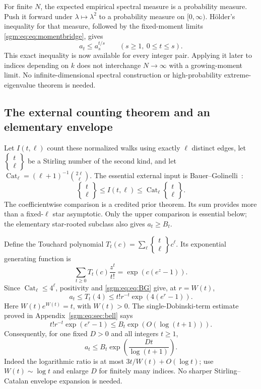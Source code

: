 \documentclass[11pt,letterpaper]{article}
\theoremstyle{remark}\newtheorem{remark}[theorem]{Remark}
\newcommand{\Cat}{\operatorname{Cat}}\newcommand{\E}{\mathbb E}\newcommand{\Prob}{\mathbb P}\newcommand{\ind}{\mathbf 1}
\newcommand{\Stir}[2]{\left\{\begin{matrix}#1\\#2\end{matrix}\right\}}
\theoremstyle{definition}\newtheorem{definition}[theorem]{Definition}
\begin{document}
For finite $N$, the expected empirical spectral measure is a probability measure. Push it forward under $\lambda\mapsto\lambda^2$ to a probability measure on $[0,\infty)$. H\"older's inequality for that measure, followed by the fixed-moment limits \eqref{sgm:eq:eq:momentbridge}, gives
\begin{equation}\label{sgm:eq:eq:holder}
 a_t\le a_s^{t/s}\qquad(s\ge1,\ 0\le t\le s).
\end{equation}
This exact inequality is now available for every integer pair. Applying it later to indices depending on $k$ does not interchange $N\to\infty$ with a growing-moment limit. No infinite-dimensional spectral construction or high-probability extreme-eigenvalue theorem is needed.

\subsection{The external counting theorem and an elementary envelope}
Let $I(t,\ell)$ count these normalized walks using exactly $\ell$ distinct edges, let $\Stir t\ell$ be a Stirling number of the second kind, and let $\Cat_\ell=(\ell+1)^{-1}\binom{2\ell}{\ell}$. The essential external input is Bauer--Golinelli~\cite[Section 5.5, equation (9)]{bg}:
\begin{equation}\label{sgm:eq:eq:BG}
 \Stir t\ell\le I(t,\ell)\le\Cat_\ell\Stir t\ell.
\end{equation}
The coefficientwise comparison is a credited prior theorem. Its sum provides more than a fixed-$\ell$ star asymptotic. Only the upper comparison is essential below; the elementary star-rooted subclass also gives $a_t\ge B_t$.

Define the Touchard polynomial $T_t(c)=\sum_\ell\Stir t\ell c^\ell$. Its exponential generating function is
\[
 \sum_{t\ge0}T_t(c)\frac{z^t}{t!}=\exp(c(e^z-1)).
\]
Since $\Cat_\ell\le4^\ell$, positivity and \eqref{sgm:eq:eq:BG} give, at $r=W(t)$,
\[
 a_t\le T_t(4)\le t!r^{-t}\exp(4(e^r-1)).
\]
Here $W(t)e^{W(t)}=t$, with $W(t)>0$. The single-Dobinski-term estimate proved in Appendix~\ref{sgm:eq:sec:bell} says
\begin{equation}\label{sgm:eq:eq:saddlefactor}
 t!r^{-t}\exp(e^r-1)\le B_t\exp(O(\log(t+1))).
\end{equation}
Consequently, for one fixed $D>0$ and all integers $t\ge1$,
\begin{equation}\label{sgm:eq:eq:envelope}
 a_t\le B_t\exp\left(\frac{Dt}{\log(t+1)}\right).
\end{equation}
Indeed the logarithmic ratio is at most $3t/W(t)+O(\log t)$; use $W(t)\sim\log t$ and enlarge $D$ for finitely many indices. No sharper Stirling--Catalan envelope expansion is needed.
\end{document}

